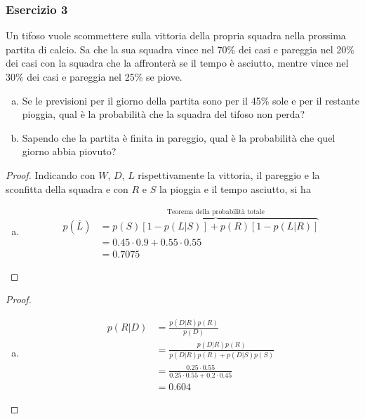 \documentclass{beamer}
\begin{document}
\begin{frame}[fragile]
	\frametitle{Esercizio 3}

	\begin{exercise}

		Un tifoso vuole scommettere sulla vittoria della propria squadra nella prossima partita di calcio. Sa che la sua squadra vince nel 70\% dei casi e pareggia nel 20\% dei casi con la squadra che la affronterà se il tempo è asciutto, mentre vince nel 30\% dei casi e pareggia nel 25\% se piove.

		\begin{enumerate}[(a)]
			\item Se le previsioni per il giorno della partita sono per il 45\% sole e per il restante pioggia, qual è la probabilità che la squadra del tifoso non perda?
			\item Sapendo che la partita è finita in pareggio, qual è la probabilità che quel giorno abbia piovuto?
		\end{enumerate}
	\end{exercise}
\end{frame}

\begin{frame}[fragile]
	\begin{proof}\renewcommand{\qedsymbol}{$\square$}

		Indicando con $W$, $D$, $L$ rispettivamente la vittoria, il pareggio e la sconfitta della squadra e con $R$ e $S$ la pioggia e il tempo asciutto, si ha

		\begin{enumerate}[(a)]
			\item \begin{align*}
				      p(\overline{L}) & = \overbrace{p(S)\left[1 - p(L|S) \right] + p(R)\left[1 - p(L|R) \right]}^{\text{Teorema della probabilità totale}} \\
				      & = 0.45\cdot0.9+0.55\cdot0.55 \\
				      & = 0.7075
			      \end{align*}
		\end{enumerate}
	\end{proof}
\end{frame}

\begin{frame}[fragile]
	\begin{proof}%
		\begin{enumerate}[(b)]
			\item \begin{align*}
				      p(R|D) & = \frac{p(D|R)p(R)}{p(D)} \\
				      & = \frac{p(D|R)p(R)}{p(D|R)p(R)+p(D|S)p(S)} \\
				      & = \frac{0.25\cdot0.55}{0.25\cdot0.55+0.2\cdot0.45} \\
				      & = 0.604
			      \end{align*}
		\end{enumerate}
	\end{proof}
\end{frame}
\end{document}
